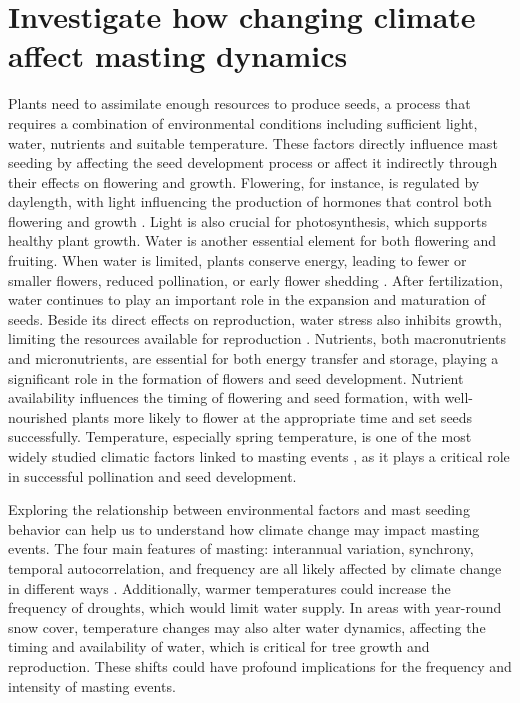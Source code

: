 \documentclass[11pt,letter]{article}
\begin{document}
\section{Investigate how changing climate affect masting dynamics}
Plants need to assimilate enough resources to produce seeds, a process that requires a combination of environmental conditions including sufficient light, water, nutrients and suitable temperature. These factors directly influence mast seeding by affecting the seed development process or affect it indirectly through their effects on flowering and growth. Flowering, for instance, is regulated by daylength, with light influencing the production of hormones that control both flowering and growth \citep{lau2010plant}. Light is also crucial for photosynthesis, which supports healthy plant growth. Water is another essential element for both flowering and fruiting. When water is limited, plants conserve energy, leading to fewer or smaller flowers, reduced pollination, or early flower shedding \citep{gallagher2017shifts}. After fertilization, water continues to play an important role in the expansion and maturation of seeds. Beside its direct effects on reproduction, water stress also inhibits growth, limiting the resources available for reproduction \citep{hsiao1973plant, anjum2011morphological}. Nutrients, both macronutrients and micronutrients, are essential for both energy transfer and storage, playing a significant role in the formation of flowers and seed development. Nutrient availability influences the timing of flowering and seed formation, with well-nourished plants more likely to flower at the appropriate time and set seeds successfully. Temperature, especially spring temperature, is one of the most widely studied climatic factors linked to masting events \citep{bajocco2021characterizing, moreira2015effects, schauber2002masting, bogdziewicz2024evolutionary}, as it plays a critical role in successful pollination and seed development.

Exploring the relationship between environmental factors and mast seeding behavior can help us to understand how climate change may impact masting events. The four main features of masting: interannual variation, synchrony, temporal autocorrelation, and frequency are all likely affected by climate change in different ways \citep{hacket2021climate}. Additionally, warmer temperatures could increase the frequency of droughts, which would limit water supply. In areas with year-round snow cover, temperature changes may also alter water dynamics, affecting the timing and availability of water, which is critical for tree growth and reproduction. These shifts could have profound implications for the frequency and intensity of masting events.
\end{document}
